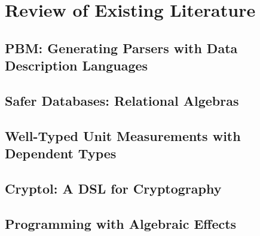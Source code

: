 \chapter{Review of Existing Literature}

\section{PBM: Generating Parsers with Data Description Languages}



\section{Safer Databases: Relational Algebras}



\section{Well-Typed Unit Measurements with Dependent Types}



\section{Cryptol: A DSL for Cryptography}



\section{Programming with Algebraic Effects}

